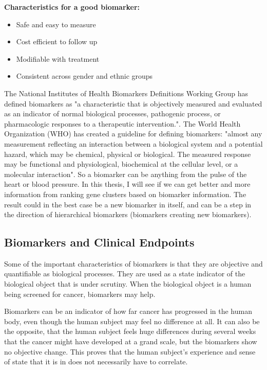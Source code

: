 \textbf{Characteristics for a good biomarker:}
\begin{itemize}
    \item Safe and easy to measure
    \item Cost efficient to follow up
    \item Modifiable with treatment
    \item Consistent across gender and ethnic groups
\end{itemize}

The National Institutes of Health Biomarkers Definitions Working Group has
defined biomarkers as "a characteristic that is objectively measured and
evaluated as an indicator of normal biological processes, pathogenic process, or
pharmacologic responses to a therapeutic
intervention."\cite{biomarker2,biomarker3}. The World Health Organization (WHO)
has created a guideline for defining biomarkers: "almost any measurement
reflecting an interaction between a biological system and a potential hazard,
which may be chemical, physical or biological. The measured response may be
functional and physiological, biochemical at the cellular level, or a molecular
interaction". So a biomarker can be anything from the pulse of the heart or
blood pressure. In this thesis, I will see if we can get better and more
information from ranking gene clusters based on biomarker information. The
result could in the best case be a new biomarker in itself, and can be a step in
the direction of hierarchical biomarkers (biomarkers creating new biomarkers).

\subsection{Biomarkers and Clinical Endpoints} 
Some of the important characteristics of biomarkers is that they are objective
and quantifiable as biological processes\cite{biomarker3}. They are used as
a state indicator of the biological object that is under scrutiny. When the
biological object is a human being screened for cancer, biomarkers may help.

Biomarkers can be an indicator of how far cancer has progressed in the human
body, even though the human subject may feel no difference at all. It can also
be the opposite, that the human subject feels huge differences during several
weeks that the cancer might have developed at a grand scale, but the biomarkers
show no objective change. This proves that the human subject's experience and
sense of state that it is in does not necessarily have to correlate.

